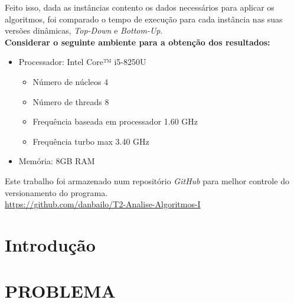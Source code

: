 \documentclass[a4paper, 12pt]{article}
\begin{document}
Feito isso, dada as instâncias contento os dados necessários para aplicar os algoritmos, foi comparado o tempo de execução para cada instância 
nas suas versões dinâmicas, {\it Top-Down} e  {\it Bottom-Up}.\\

{\bf Considerar o seguinte ambiente para a obtenção dos resultados:}
\begin{itemize}
    \item Processador: Intel Core™ i5-8250U
    \begin{itemize}
        \item Número de núcleos 4
        \item Número de threads 8
        \item Frequência baseada em processador 1.60 GHz
        \item Frequência turbo max 3.40 GHz
    \end{itemize}
    \item Memória: 8GB RAM
\end{itemize}
Este trabalho foi armazenado num repositório {\it GitHub} para melhor controle do versionamento do programa.\\
\url{https://github.com/danbailo/T2-Analise-Algoritmos-I}
\clearpage

\section{Introdução}
\clearpage

\section{PROBLEMA}
\end{document}
